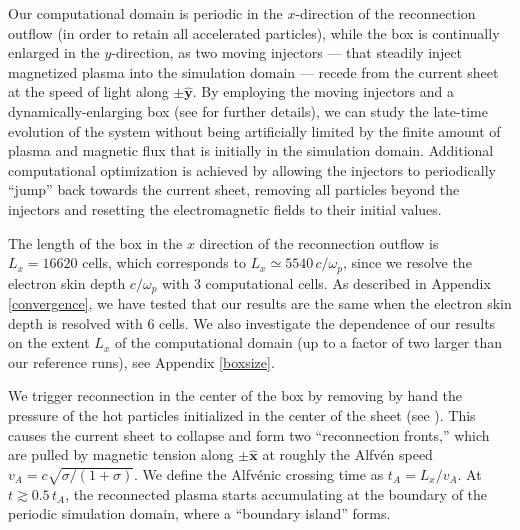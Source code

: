 Our computational domain is periodic in the $x$-direction of the reconnection outflow (in order to retain all accelerated particles), while the box is continually enlarged in the $y$-direction, as two moving injectors --- that steadily inject magnetized plasma into the simulation domain --- recede from the current sheet at the speed of light along $\pm\bm{\hat{y}}$. By employing the moving injectors and a dynamically-enlarging box (see \citealt{sironi2009} for further details), we can study the late-time evolution of the system without being artificially limited by the finite amount of plasma and magnetic flux that is initially in the simulation domain. Additional computational optimization is achieved by allowing the injectors to periodically ``jump'' back towards the current sheet, removing all particles beyond the injectors and resetting the electromagnetic fields to their initial values.

The length of the box in the $x$ direction of the reconnection outflow is $L_x=16620$ cells, which corresponds to $L_x\simeq5540\,c/\omega_{p}$, since we resolve the electron skin depth $c/\omega_{p}$ with 3 computational cells. As described in Appendix \ref{convergence}, we have tested that our results are the same when the electron skin depth is resolved with 6 cells. We also investigate the dependence of our results on the extent $L_x$ of the computational domain (up to a factor of two larger than our reference runs), see Appendix \ref{boxsize}.

We trigger reconnection in the center of the box by removing by hand the pressure of the hot particles initialized in the center of the sheet (see \citealt{sironi2016}).  This causes the current sheet to collapse and form two ``reconnection fronts,'' which are pulled by magnetic tension along $\pm \bm{\hat{x}}$ at roughly the Alfv\'en speed $v_{A}=c\sqrt{\sigma/(1+\sigma)}$.  We define the Alfv\'enic crossing time as  $t_{A} = L_{x}/v_{A}$.  At $t\gtrsim 0.5\,t_A$, the reconnected plasma starts accumulating at the boundary of the periodic simulation domain, where a ``boundary island'' forms.

